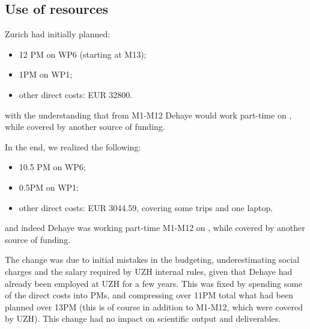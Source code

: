   \subsection{Use of resources}

Zurich had initially planned:
\begin{itemize}
\item 12 PM on WP6 (starting at M13);
\item 1PM on WP1;
\item other direct costs: EUR 32800.
\end{itemize}
with the understanding that from M1-M12 Dehaye would work part-time on \ODK, while covered by another source of funding.

In the end, we realized the following:
\begin{itemize}
\item 10.5 PM on WP6;
\item 0.5PM on WP1;
\item other direct costs: EUR 3044.59, covering some \ODK trips and one laptop.
\end{itemize}
and indeed Dehaye was working part-time M1-M12 on \ODK, while covered by another source of funding. 

The change was due to initial mistakes in the budgeting, underestimating social charges and the salary required by UZH internal rules, given that Dehaye had already been employed at UZH for a few years. This was fixed by spending some of the direct costs into PMs, and compressing over 11PM total what had been planned over 13PM (this is of course in addition to M1-M12, which were covered by UZH). This change had no impact on scientific output and deliverables. 




